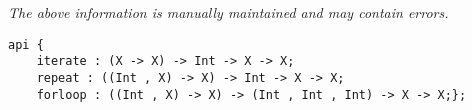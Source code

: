 \label{api:Iterate}

{\tiny \it The above information is manually maintained and may contain errors.}
\begin{verbatim}
api {
    iterate : (X -> X) -> Int -> X -> X;
    repeat : ((Int , X) -> X) -> Int -> X -> X;
    forloop : ((Int , X) -> X) -> (Int , Int , Int) -> X -> X;};
\end{verbatim}
